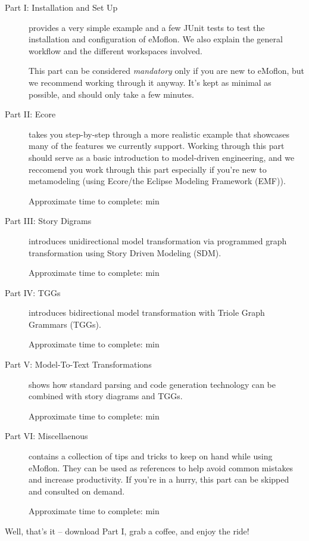 \begin{description}

\item[Part I: Installation and Set Up] provides a very simple example and a few JUnit tests to test the installation and configuration of eMoflon. We also explain the general workflow and the different workspaces involved.

This part can be considered \emph{mandatory} only if you are new to eMoflon, but we recommend working through it anyway.
It's kept as minimal as possible, and should only take a few minutes.

\item[Part II: Ecore] takes you step-by-step through a more realistic example that showcases many of the features we currently support.
Working through this part should serve as a basic introduction to model-driven engineering, and we reccomend you work through this part especially if you're new to metamodeling (using Ecore/the Eclipse Modeling Framework (EMF)).

{\small Approximate time to complete: min }

\item[Part III: Story Digrams] introduces unidirectional model transformation via programmed graph transformation using Story Driven Modeling (SDM).

{\small Approximate time to complete: min }

\item[Part IV: TGGs] introduces bidirectional model transformation with Triole Graph Grammars (TGGs).

{\small Approximate time to complete: min }

\item[Part V: Model-To-Text Transformations] shows how standard parsing and code generation technology can be combined with story diagrams and TGGs.

{\small Approximate time to complete: min }

\item[Part VI: Miscellaenous] contains a collection of tips and tricks to keep on hand while using eMoflon. They can be used as references to help avoid common mistakes and increase productivity. If you're in a hurry, this part can be skipped and consulted on demand.

{\small Approximate time to complete: min }

\end{description}

Well, that's it -- download Part I, grab a coffee, and enjoy the ride!

